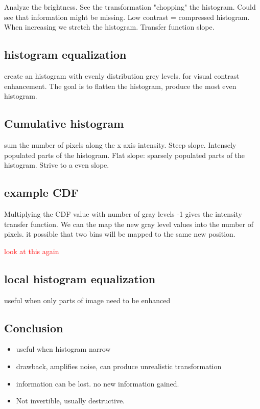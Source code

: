 Analyze the brightness. See the transformation "chopping" the histogram. Could see that information might be missing. Low contrast = compressed histogram. When increasing we stretch the histogram. Transfer function slope. 

\subsection*{histogram equalization}
create an histogram with evenly distribution grey levels. for visual contrast enhancement. The goal is to flatten the histogram, produce the most even histogram. 

\subsection*{Cumulative histogram}
sum the number of pixels along the x axis intensity.
Steep slope. Intensely populated parts of the histogram. Flat slope: sparsely populated parts of the histogram. Strive to a even slope. 

\subsection*{example CDF}
Multiplying the CDF value with  number of gray levels -1 gives the intensity transfer function. We can the map the new gray level values into the number of pixels. it possible that two bins will be mapped to the same new position. 

\textcolor{red}{look at this again}

\subsection*{local histogram equalization}
useful when only parts of image need to be enhanced 

\subsection*{Conclusion}
\begin{itemize}
    \item useful when histogram narrow
    \item drawback, amplifies noise, can produce unrealistic transformation
    \item information can be lost. no new information gained. 
    \item Not invertible, usually destructive. 
\end{itemize}

